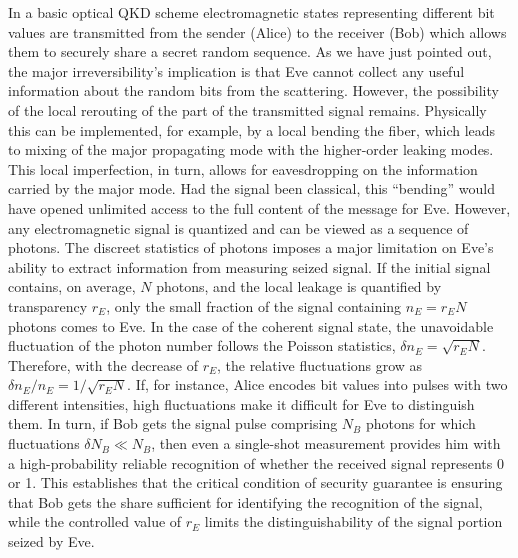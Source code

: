 \documentclass[a4paper]{article}
\begin{document}
In a basic optical QKD scheme electromagnetic states representing different bit values are transmitted from the sender (Alice) to the receiver (Bob) which allows them to securely share a secret random sequence.
As we have just pointed out, the major irreversibility’s implication is that Eve cannot collect any useful information about the random bits from the scattering. 
However, the possibility of the local rerouting of the part of the transmitted signal remains. 
Physically this can be implemented, for example, by a local bending the fiber, which leads to mixing of the major propagating mode with the higher-order leaking modes. 
This local imperfection, in turn, allows for eavesdropping on the information carried by the major mode. 
Had the signal been classical, this “bending” would have opened unlimited access to the full content of the message for Eve. 
However, any electromagnetic signal is quantized and can be viewed as a sequence of photons. 
The discreet statistics of photons imposes a major limitation on Eve's ability to extract information from measuring seized signal.
If the initial signal contains, on average, $N$ photons, and the local leakage is quantified by transparency $r_E$, only the small fraction of the signal containing $n_E=r_EN$ photons comes to Eve. 
In the case of the coherent signal state, the  unavoidable fluctuation of the photon number follows the Poisson statistics, $\delta n_E=\sqrt{r_EN}$.
Therefore, with the decrease of $r_E$, the relative fluctuations grow as $\delta n_E/n_E=1/\sqrt{r_EN}$.
If, for instance, Alice encodes bit values into pulses with two different intensities, high fluctuations make it difficult for Eve to distinguish them.
In turn, if Bob gets the signal pulse comprising $N_{B}$ photons for which fluctuations $\delta N_{B}\ll N_{B}$, then even a single-shot measurement provides him with a high-probability reliable recognition of whether the received signal represents 0 or 1.
This establishes that the critical condition of security guarantee is ensuring that Bob gets the share sufficient for identifying the recognition of the signal, while the controlled value of $r_E$ limits the distinguishability of the signal portion seized by Eve.
\end{document}
